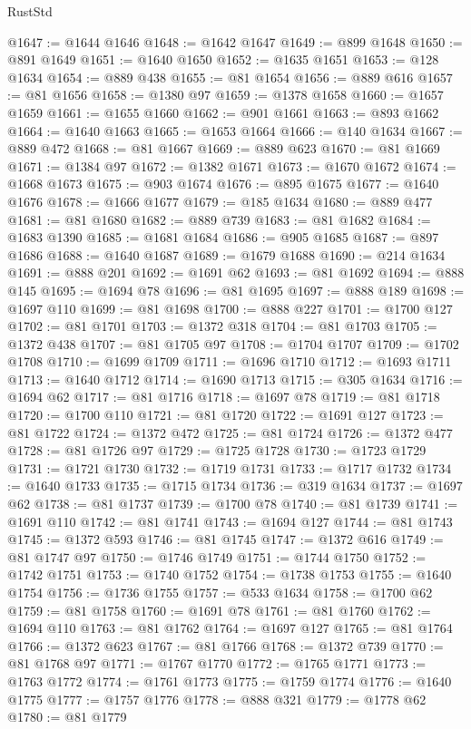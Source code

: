 \begin{lexlean}{RustStd}
\begin{coremodule}
@1647 := @1644 @1646
@1648 := @1642 @1647
@1649 := @899 @1648
@1650 := @891 @1649
@1651 := @1640 @1650
@1652 := @1635 @1651
@1653 := @128 @1634
@1654 := @889 @438
@1655 := @81 @1654
@1656 := @889 @616
@1657 := @81 @1656
@1658 := @1380 @97
@1659 := @1378 @1658
@1660 := @1657 @1659
@1661 := @1655 @1660
@1662 := @901 @1661
@1663 := @893 @1662
@1664 := @1640 @1663
@1665 := @1653 @1664
@1666 := @140 @1634
@1667 := @889 @472
@1668 := @81 @1667
@1669 := @889 @623
@1670 := @81 @1669
@1671 := @1384 @97
@1672 := @1382 @1671
@1673 := @1670 @1672
@1674 := @1668 @1673
@1675 := @903 @1674
@1676 := @895 @1675
@1677 := @1640 @1676
@1678 := @1666 @1677
@1679 := @185 @1634
@1680 := @889 @477
@1681 := @81 @1680
@1682 := @889 @739
@1683 := @81 @1682
@1684 := @1683 @1390
@1685 := @1681 @1684
@1686 := @905 @1685
@1687 := @897 @1686
@1688 := @1640 @1687
@1689 := @1679 @1688
@1690 := @214 @1634
@1691 := @888 @201
@1692 := @1691 @62
@1693 := @81 @1692
@1694 := @888 @145
@1695 := @1694 @78
@1696 := @81 @1695
@1697 := @888 @189
@1698 := @1697 @110
@1699 := @81 @1698
@1700 := @888 @227
@1701 := @1700 @127
@1702 := @81 @1701
@1703 := @1372 @318
@1704 := @81 @1703
@1705 := @1372 @438
@1707 := @81 @1705 @97
@1708 := @1704 @1707
@1709 := @1702 @1708
@1710 := @1699 @1709
@1711 := @1696 @1710
@1712 := @1693 @1711
@1713 := @1640 @1712
@1714 := @1690 @1713
@1715 := @305 @1634
@1716 := @1694 @62
@1717 := @81 @1716
@1718 := @1697 @78
@1719 := @81 @1718
@1720 := @1700 @110
@1721 := @81 @1720
@1722 := @1691 @127
@1723 := @81 @1722
@1724 := @1372 @472
@1725 := @81 @1724
@1726 := @1372 @477
@1728 := @81 @1726 @97
@1729 := @1725 @1728
@1730 := @1723 @1729
@1731 := @1721 @1730
@1732 := @1719 @1731
@1733 := @1717 @1732
@1734 := @1640 @1733
@1735 := @1715 @1734
@1736 := @319 @1634
@1737 := @1697 @62
@1738 := @81 @1737
@1739 := @1700 @78
@1740 := @81 @1739
@1741 := @1691 @110
@1742 := @81 @1741
@1743 := @1694 @127
@1744 := @81 @1743
@1745 := @1372 @593
@1746 := @81 @1745
@1747 := @1372 @616
@1749 := @81 @1747 @97
@1750 := @1746 @1749
@1751 := @1744 @1750
@1752 := @1742 @1751
@1753 := @1740 @1752
@1754 := @1738 @1753
@1755 := @1640 @1754
@1756 := @1736 @1755
@1757 := @533 @1634
@1758 := @1700 @62
@1759 := @81 @1758
@1760 := @1691 @78
@1761 := @81 @1760
@1762 := @1694 @110
@1763 := @81 @1762
@1764 := @1697 @127
@1765 := @81 @1764
@1766 := @1372 @623
@1767 := @81 @1766
@1768 := @1372 @739
@1770 := @81 @1768 @97
@1771 := @1767 @1770
@1772 := @1765 @1771
@1773 := @1763 @1772
@1774 := @1761 @1773
@1775 := @1759 @1774
@1776 := @1640 @1775
@1777 := @1757 @1776
@1778 := @888 @321
@1779 := @1778 @62
@1780 := @81 @1779

\end{coremodule}
\end{lexlean}
